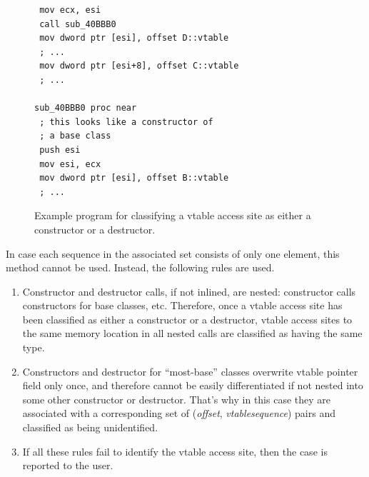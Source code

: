 \documentclass[10pt, conference]{IEEEtran}
\newcommand{\offset}{\textit{offset}}
\newcommand{\vtable}{\textit{vtable}}
\newcommand{\sequence}{\textit{sequence}}
\newcommand{\compact}{}
\newcommand{\listingsize}{\normalsize}
\begin{document}
\begin{figure}[tb!]
\hspace{0.5cm}
\begin{minipage}[b]{1cm}
{
\lstset{basicstyle=\listingsize, language=[x86masm]Assembler}
\begin{lstlisting}
 mov ecx, esi
 call sub_40BBB0
 mov dword ptr [esi], offset D::vtable
 ; ...
 mov dword ptr [esi+8], offset C::vtable
 ; ...
 
sub_40BBB0 proc near
 ; this looks like a constructor of
 ; a base class
 push esi
 mov esi, ecx
 mov dword ptr [esi], offset B::vtable
 ; ...
\end{lstlisting}
}
\end{minipage}
\caption{Example program for classifying a vtable access site as either a constructor or a destructor.}
\label{listing:chained_example}
\end{figure}

In case each sequence in the associated set consists of
only one element, this method cannot be used. Instead, the
following rules are used.
\begin{enumerate}\compact
%
%
\item Constructor and destructor calls, if not inlined, are nested:
constructor calls constructors for base classes, etc.
Therefore, once a vtable access site has been classified as either
a constructor or a destructor, vtable access sites to the same memory
location in all nested calls are classified as having the same type.
\item Constructors and destructor for ``most-base'' classes
overwrite vtable pointer field only once, and therefore
cannot be easily differentiated if not nested into some other
constructor or destructor. That's why in this case they are
associated with a corresponding set of (\offset, \vtable\:\sequence) pairs
and classified as being unidentified.
\item If all these rules fail to identify the vtable access
site, then the case is reported to the user. %
\end{enumerate}
\end{document}
